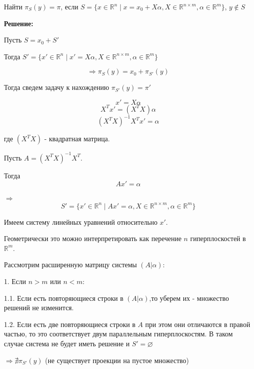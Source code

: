 \documentclass[a4paper,12pt]{article}
\newcommand{\lt}{\left}
\newcommand{\rt}{\right}
\newcommand{\al}{\alpha}
\begin{document}
Найти $\pi_S (y) = \pi$, если $S = \{x \in \mathbb{R}^n \mid x = x_0 + X\alpha, X \in \mathbb{R}^{n \times m},  \alpha \in \mathbb{R}^{m}\}$, $y \notin S$

\vspace{\baselineskip}

\textbf{Решение:}

\vspace{\baselineskip}

Пусть $S = x_0 + S'$

Тогда $S' = \{x' \in \mathbb{R}^n \mid x' = X\alpha, X \in \mathbb{R}^{n \times m},  \alpha \in \mathbb{R}^{m}\}$

\begin{equation}\label{eq_pi}
\Rightarrow \pi_S (y) = x_0+\pi_{S'} (y)
\end{equation}

Тогда сведем задачу к нахождению $\pi_{S'} (y) = \pi'$

$$x' = X\alpha$$
$$X^Tx' = (X^TX)\alpha$$
$$(X^TX)^{-1}X^Tx' = \alpha$$

где $(X^TX)$ - квадратная матрица.

Пусть $A = (X^TX)^{-1}X^T$.

Тогда $$Ax' = \alpha$$

$\Rightarrow$
\begin{equation}\label{eq_S'}
S' = \{x' \in \mathbb{R}^n \mid Ax' = \alpha, X \in \mathbb{R}^{n \times m},  \alpha \in \mathbb{R}^{m}\}
\end{equation}

Имеем систему линейных уравнений относительно $x'$.

Геометрически это можно интерпретировать как перечение $n$ гиперплоскостей в $\mathbb{R}^{m}$.

\vspace{\baselineskip}

Рассмотрим расширенную матрицу системы $\lt(A|\al\rt)$:

\vspace{\baselineskip}

1. Если $n > m$ или $n < m$:

1.1. Если есть повторяющиеся строки в $\lt(A|\al\rt)$,то уберем их - множество решений не изменится.

1.2. Если есть две повторяющиеся строки в $A$ при этом они отличаются в правой частью, то это соответствует двум параллельным гиперплоскостям. В таком случае система не будет иметь решение и  $S'=\varnothing$

$\Rightarrow \nexists \pi_{S'}(y)$ (не существует проекции на пустое множество)
\end{document}

